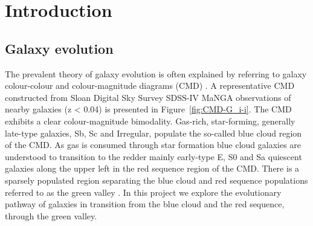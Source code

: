 \section{Introduction}
\label{sec:introduction}

\subsection{Galaxy evolution}
\label{sec:evolution}

The prevalent theory of galaxy evolution is often explained  by  referring to galaxy colour-colour and colour-magnitude diagrams (CMD) \citep[see e.g.][]{2001AJ....122.1861S, 2003ApJ...585L...5H, 2003ApJS..149..289B,baldry2004quantifying,2006MNRAS.373..469B}. A representative CMD constructed from Sloan Digital Sky Survey SDSS-IV MaNGA observations of nearby galaxies (z < 0.04) is presented in  Figure~\ref{fig:CMD-G_i-i}. The CMD exhibits a clear colour-magnitude bimodality.  Gas-rich, star-forming, generally late-type galaxies, Sb, Sc and Irregular, populate the so-called blue cloud region of the CMD. As gas is consumed through star formation blue cloud galaxies are understood to transition to the redder mainly early-type E, S0 and Sa quiescent galaxies along the upper left in the red sequence region of the CMD. There is a sparsely populated region separating the blue cloud and red sequence populations referred to as the green valley \citep{2004ApJ...608..752B}. In this project we explore the evolutionary pathway of galaxies in transition from the blue cloud and the red sequence, through the green valley.

